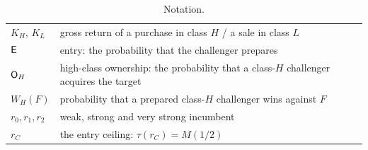 \begin{table}[!ht]
\begin{tabularx}{\linewidth}{@{}l X@{}}
\(K_H\), \(K_L\) & gross return of a purchase in class \(H\) / a sale in class \(L\)\\
\(\mathsf{E}\) & entry: the probability that the challenger prepares\\
\(\mathsf{O}_H\) & high-class ownership: the probability that a class-\(H\) challenger acquires the target\\
\(W_H(F)\) & probability that a prepared class-\(H\) challenger wins against \(F\)\\
\(r_0,r_1,r_2\) & weak, strong and very strong incumbent\\
\(r_C\) & the entry ceiling: \(\tau(r_C)=M(1/2)\)\\
\bottomrule
\end{tabularx}
\caption{Notation.}
\label{tab:02_model-notation}
\end{table}
